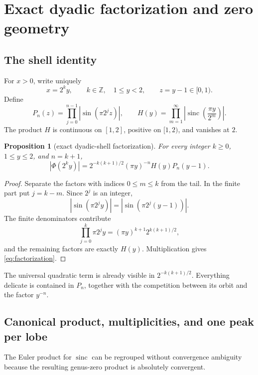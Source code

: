 \documentclass[11pt,oneside]{article}
\newtheorem{proposition}[theorem]{Proposition}
\theoremstyle{definition}
\theoremstyle{remark}
\newcommand{\Z}{\mathbb Z}
\newcommand{\sinc}{\operatorname{sinc}}
\newcommand{\abs}[1]{\left|#1\right|}
\begin{document}
\section{Exact dyadic factorization and zero geometry}
\label{sec:factorization}

\subsection{The shell identity}

For \(x>0\), write uniquely
\[
 x=2^ky,
 \qquad k\in\Z,\quad 1\le y<2,
 \qquad z=y-1\in[0,1).
\]
Define
\begin{equation}
 P_n(z)=\prod_{j=0}^{n-1}\abs{\sin(\pi2^jz)},
 \qquad
 H(y)=\prod_{m=1}^{\infty}\abs{\sinc\!\left(\frac{\pi y}{2^m}\right)}.
 \label{eq:P-H}
\end{equation}
The product \(H\) is continuous on \([1,2]\), positive on \([1,2)\), and
vanishes at \(2\).

\begin{proposition}[exact dyadic-shell factorization]
\label{prop:factorization}
For every integer \(k\ge0\), \(1\le y\le2\), and \(n=k+1\),
\begin{equation}
 \boxed{
 |\Phi(2^ky)|
 =2^{-k(k+1)/2}(\pi y)^{-n}H(y)P_n(y-1).}
 \label{eq:factorization}
\end{equation}
\end{proposition}

\begin{proof}
Separate the factors with indices \(0\le m\le k\) from the tail.  In the
finite part put \(j=k-m\).  Since \(2^j\) is an integer,
\[
 \abs{\sin(\pi2^jy)}=\abs{\sin(\pi2^j(y-1))}.
\]
The finite denominators contribute
\[
 \prod_{j=0}^k \pi2^jy=(\pi y)^{k+1}2^{k(k+1)/2},
\]
and the remaining factors are exactly \(H(y)\).  Multiplication gives
\eqref{eq:factorization}.
\end{proof}

The universal quadratic term is already visible in
\(2^{-k(k+1)/2}\).  Everything delicate is contained in \(P_n\), together
with the competition between its orbit and the factor \(y^{-n}\).

\subsection{Canonical product, multiplicities, and one peak per lobe}

The Euler product for \(\sinc\) can be regrouped without convergence
ambiguity because the resulting genus-zero product is absolutely convergent.
\end{document}

